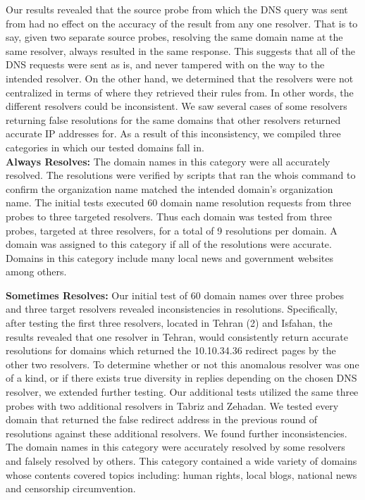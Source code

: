         Our results revealed that the source probe from which the DNS query was sent from had no effect on the accuracy of the result from any one resolver. That is to say, given two separate source probes, resolving the same domain name at the same resolver, always resulted in the same response. This suggests that all of the DNS requests were sent as is, and never tampered with on the way to the intended resolver. On the other hand, we determined that the resolvers were not centralized in terms of where they retrieved their rules from. In other words, the different resolvers could be inconsistent. We saw several cases of some resolvers returning false resolutions for the same domains that other resolvers returned accurate IP addresses for. As a result of this inconsistency, we compiled three categories in which our tested domains fall in.\\


\textbf{Always Resolves:} The domain names in this category were all accurately resolved. The resolutions were verified by scripts that ran the whois command to confirm the organization name matched the intended domain’s organization name. The initial tests executed 60 domain name resolution requests from three probes to three targeted resolvers. Thus each domain was tested from three probes, targeted at three resolvers, for a total of 9 resolutions per domain. A domain was assigned to this category if all of the resolutions were accurate. Domains in this category include many local news and government websites among others.

\textbf{Sometimes Resolves:} Our initial test of 60 domain names over three probes and three target resolvers revealed inconsistencies in resolutions. Specifically, after testing the first three resolvers, located in Tehran (2) and Isfahan, the results revealed that one resolver in Tehran, would consistently return accurate resolutions for domains which returned the 10.10.34.36 redirect pages by the other two resolvers. To determine whether or not this anomalous resolver was one of a kind, or if there exists true diversity in replies depending on the chosen DNS resolver, we extended further testing. Our additional tests utilized the same three probes with two additional resolvers in Tabriz and Zehadan. We tested every domain that returned the false redirect address in the previous round of resolutions against these additional resolvers. We found further inconsistencies. The domain names in this category were accurately resolved by some resolvers and falsely resolved by others. This category contained a wide variety of domains whose contents covered topics including: human rights, local blogs, national news and censorship circumvention.

